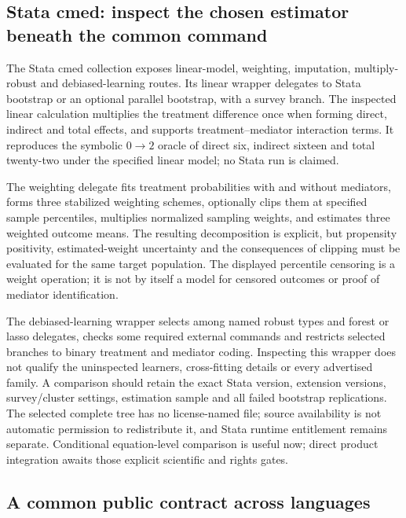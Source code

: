 \subsection{Stata cmed: inspect the chosen estimator beneath the common command}

The Stata cmed collection exposes linear-model, weighting, imputation,
multiply-robust and debiased-learning routes. Its linear wrapper delegates to
Stata bootstrap or an optional parallel bootstrap, with a survey branch. The
inspected linear calculation multiplies the treatment difference once when
forming direct, indirect and total effects, and supports treatment--mediator
interaction terms. It reproduces the symbolic $0\rightarrow2$ oracle of
direct six, indirect sixteen and total twenty-two under the specified linear
model; no Stata run is claimed.~\citep{exec25_omed_cmedstata,exec25_omed_choice}

The weighting delegate fits treatment probabilities with and without mediators,
forms three stabilized weighting schemes, optionally clips them at specified
sample percentiles, multiplies normalized sampling weights, and estimates three
weighted outcome means. The resulting decomposition is explicit, but propensity
positivity, estimated-weight uncertainty and the consequences of clipping must
be evaluated for the same target population. The displayed percentile censoring
is a weight operation; it is not by itself a model for censored outcomes or
proof of mediator identification.~\citep{exec25_omed_cmedstata}

The debiased-learning wrapper selects among named robust types and forest or
lasso delegates, checks some required external commands and restricts selected
branches to binary treatment and mediator coding. Inspecting this wrapper does
not qualify the uninspected learners, cross-fitting details or every advertised
family. A comparison should retain the exact Stata version, extension versions,
survey/cluster settings, estimation sample and all failed bootstrap replications.
The selected complete tree has no license-named file; source availability is not
automatic permission to redistribute it, and Stata runtime entitlement remains
separate. Conditional equation-level comparison is useful now; direct product
integration awaits those explicit scientific and rights gates.~\citep{exec25_omed_cmedstata,exec25_omed_choice}

\subsection{A common public contract across languages}

